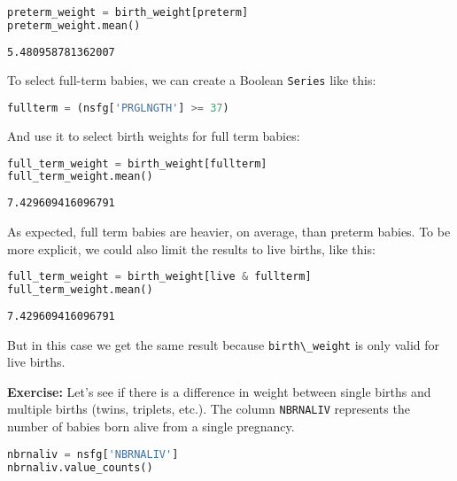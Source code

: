 \begin{lstlisting}[language=Python,style=source]
preterm_weight = birth_weight[preterm]
preterm_weight.mean()
\end{lstlisting}

\begin{lstlisting}[style=output]
5.480958781362007
\end{lstlisting}

To select full-term babies, we can create a Boolean
\passthrough{\lstinline!Series!} like this:

\begin{lstlisting}[language=Python,style=source]
fullterm = (nsfg['PRGLNGTH'] >= 37)
\end{lstlisting}

And use it to select birth weights for full term babies:

\begin{lstlisting}[language=Python,style=source]
full_term_weight = birth_weight[fullterm]
full_term_weight.mean()
\end{lstlisting}

\begin{lstlisting}[style=output]
7.429609416096791
\end{lstlisting}

As expected, full term babies are heavier, on average, than preterm
babies. To be more explicit, we could also limit the results to live
births, like this:

\begin{lstlisting}[language=Python,style=source]
full_term_weight = birth_weight[live & fullterm]
full_term_weight.mean()
\end{lstlisting}

\begin{lstlisting}[style=output]
7.429609416096791
\end{lstlisting}

But in this case we get the same result because
\passthrough{\lstinline!birth\_weight!} is only valid for live births.

\textbf{Exercise:} Let's see if there is a difference in weight between
single births and multiple births (twins, triplets, etc.). The column
\passthrough{\lstinline!NBRNALIV!} represents the number of babies born
alive from a single pregnancy.


\begin{lstlisting}[language=Python,style=source]
nbrnaliv = nsfg['NBRNALIV']
nbrnaliv.value_counts()
\end{lstlisting}

